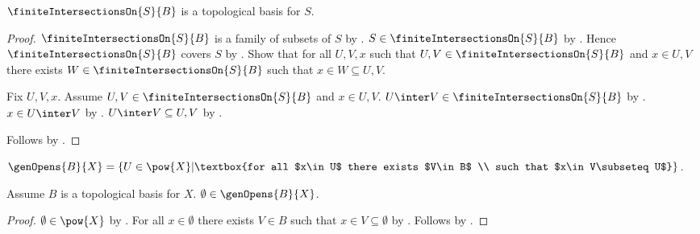 \begin{theorem}\label{finite_intersections_form_topological_basis}
    $\finiteIntersectionsOn{S}{B}$ is a topological basis for $S$.
\end{theorem}
\begin{proof}
    $\finiteIntersectionsOn{S}{B}$ is a family of subsets of $S$ by
        .
    $S\in\finiteIntersectionsOn{S}{B}$ by
        .
    Hence $\finiteIntersectionsOn{S}{B}$ covers $S$ by
        .
    Show that for all $U,V,x$ such that
        $U,V\in\finiteIntersectionsOn{S}{B}$ and $x\in U,V$
        there exists $W\in\finiteIntersectionsOn{S}{B}$ such that
            $x\in W\subseteq U,V$.
    \begin{subproof}
        Fix $U,V,x$.
        Assume $U,V\in\finiteIntersectionsOn{S}{B}$ and $x\in U,V$.
        $U\inter V\in\finiteIntersectionsOn{S}{B}$ by
            .
        $x\in U\inter V$ by .
        $U\inter V\subseteq U,V$ by .
    \end{subproof}
    Follows by .
\end{proof}

\begin{definition}\label{genopens}
    $\genOpens{B}{X} = \left\{ U\in\pow{X} \middle| \textbox{for all $x\in U$ there exists $V\in B$
    \\ such that $x\in V\subseteq U$}\right\}$.
\end{definition}

\begin{lemma}\label{emptyset_in_genopens}
    Assume $B$ is a topological basis for $X$.
    $\emptyset \in \genOpens{B}{X}$.
\end{lemma}
\begin{proof}
    $\emptyset\in\pow{X}$ by .
    For all $x\in\emptyset$ there exists $V\in B$
        such that $x\in V\subseteq\emptyset$
        by .
    Follows by .
\end{proof}

